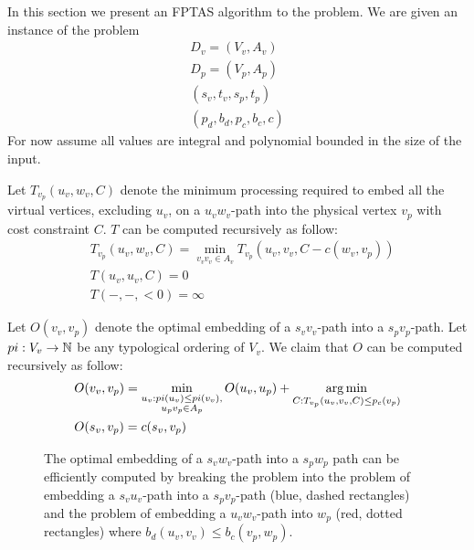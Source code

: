 In this section we present an FPTAS algorithm to the \VPN problem.
We are given an instance of the \VPN problem 
\begin{align*}
D_v = (V_v, A_v)		\\
D_p = (V_p, A_p)		\\
(s_v, t_v, s_p, t_p)	\\
(p_d, b_d, p_c, b_c, c)
\end{align*}
For now assume all values are integral and polynomial bounded in the size of the input.

Let $T_{v_p}(u_v, w_v, C)$ denote the minimum processing required to embed
all the virtual vertices, excluding $u_v$, on a $u_vw_v$-path into the physical
vertex $v_p$ with cost constraint $C$.
$T$ can be computed recursively as follow:
\begin{align*}
&T_{v_p}(u_v, w_v, C) = 
\min_{v_vv_v \in A_v} T_{v_p}(u_v, v_v, C - c(w_v, v_p))
\\
&T(u_v, u_v, C) = 0
\\
&T(-, -, <0) = \infty
\end{align*}
 
Let $O(v_v, v_p)$ denote the optimal embedding of a $s_vv_v$-path into a
$s_pv_p$-path.
Let $pi:V_v \to \mathbb{N}$ be any typological ordering of $V_v$. 
We claim that $O$ can be computed recursively as follow:
\begin{align*}
&O(v_v, v_p) = 
\min_{\substack{
u_v : pi(u_v) \leq pi(v_v), 
\\
u_pv_p \in A_p
}}
O(u_v, u_p)
+
\operatorname*{arg\,min}_{C : T_{v_p}(u_v, v_v, C) \leq p_c(v_p)}
\\
&O(s_v, v_p) = c(s_v, v_p)
\end{align*}

\begin{figure}[ht]
\centering

\caption[]{
The optimal embedding of a $s_vw_v$-path into a $s_pw_p$ path can be efficiently 
computed by breaking the problem into the problem of embedding a $s_vu_v$-path
into a $s_pv_p$-path (blue, dashed rectangles) 
and the problem of embedding a $u_vw_v$-path into $w_p$ (red, dotted
rectangles) where $b_d(u_v, v_v) \leq b_c(v_p, w_p)$.
}
\end{figure}


